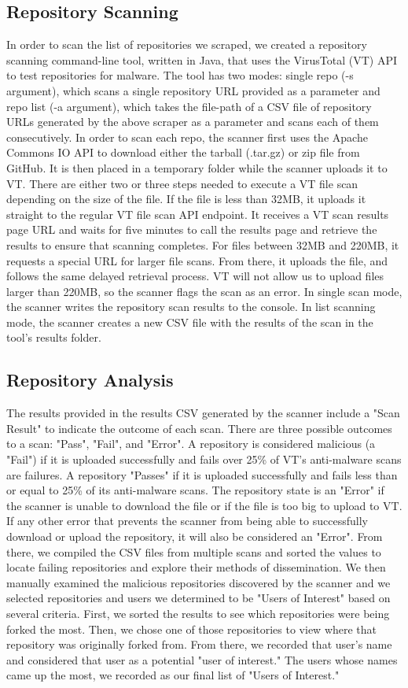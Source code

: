 \documentclass[]{acmart}
\begin{document}
\subsection{Repository Scanning}
In order to scan the list of repositories we scraped, we created a repository scanning command-line tool, written in Java, that uses the VirusTotal (VT) API to test repositories for malware. The tool has two modes: single repo (-s argument), which scans a single repository URL provided as a parameter and repo list (-a argument), which takes the file-path of a CSV file of repository URLs generated by the above scraper as a parameter and scans each of them consecutively. In order to scan each repo, the scanner first uses the Apache Commons IO API to download either the tarball (.tar.gz) or zip file from GitHub. It is then placed in a temporary folder while the scanner uploads it to VT. There are either two or three steps needed to execute a VT file scan depending on the size of the file. If the file is less than 32MB, it uploads it straight to the regular VT file scan API endpoint. It receives a VT scan results page URL and waits for five minutes to call the results page and retrieve the results to ensure that scanning completes. For files between 32MB and 220MB, it requests a special URL for larger file scans. From there, it uploads the file, and follows the same delayed retrieval process. VT will not allow us to upload files larger than 220MB, so the scanner flags the scan as an error. In single scan mode, the scanner writes the repository scan results to the console. In list scanning mode, the scanner creates a new CSV file with the results of the scan in the tool's results folder.
\subsection{Repository Analysis}
The results provided in the results CSV generated by the scanner include a "Scan Result" to indicate the outcome of each scan. There are three possible outcomes to a scan: "Pass", "Fail", and "Error". A repository is considered malicious (a "Fail") if it is uploaded successfully and fails over 25\% of VT's anti-malware scans are failures. A repository "Passes" if it is uploaded successfully and fails less than or equal to 25\% of its anti-malware scans. The repository state is an "Error" if the scanner is unable to download the file or if the file is too big to upload to VT. If any other error that prevents the scanner from being able to successfully download or upload the repository, it will also be considered an "Error". From there, we compiled the CSV files from multiple scans and sorted the values to locate failing repositories and explore their methods of dissemination. We then manually examined the malicious repositories discovered by the scanner and we selected repositories and users we determined to be "Users of Interest" based on several criteria. First, we sorted the results to see which repositories were being forked the most. Then, we chose one of those repositories to view where that repository was originally forked from. From there, we recorded that user's name and considered that user as a potential "user of interest." The users whose names came up the most, we recorded as our final list of "Users of Interest."
\end{document}
